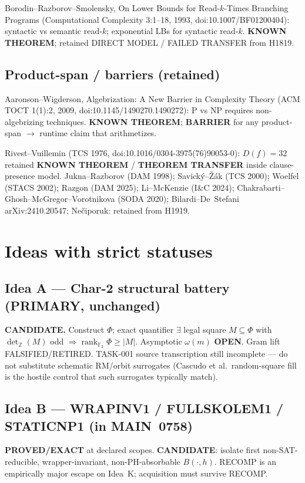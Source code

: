 \documentclass[11pt]{article}
\begin{document}
Borodin--Razborov--Smolensky, On Lower Bounds for Read-$k$-Times Branching Programs
(Computational Complexity 3:1--18, 1993, doi:10.1007/BF01200404):
syntactic vs semantic read-$k$; exponential LBs for syntactic read-$k$.
\textbf{KNOWN THEOREM}; retained DIRECT MODEL / FAILED TRANSFER from H1819.

\subsection*{Product-span / barriers (retained)}
Aaronson--Wigderson, Algebrization: A New Barrier in Complexity Theory
(ACM TOCT 1(1):2, 2009, doi:10.1145/1490270.1490272): P vs NP requires non-algebrizing
techniques.
\textbf{KNOWN THEOREM}; \textbf{BARRIER} for any product-span $\to$ runtime claim that
arithmetizes.

Rivest--Vuillemin (TCS 1976, doi:10.1016/0304-3975(76)90053-0): $D(f)=32$ retained
\textbf{KNOWN THEOREM} / \textbf{THEOREM TRANSFER} inside clause-presence model.
Jukna--Razborov (DAM 1998); Savick\'y--\v{Z}\'ak (TCS 2000); Woelfel (STACS 2002);
Razgon (DAM 2025); Li--McKenzie (I\&C 2024); Chakrabarti--Ghosh--McGregor--Vorotnikova
(SODA 2020); Bilardi--De~Stefani arXiv:2410.20547; Ne\v{c}iporuk: retained from H1919.

\section*{Ideas with strict statuses}
\subsection*{Idea A --- Char-2 structural battery (PRIMARY, unchanged)}
\textbf{CANDIDATE.} Construct $\Phi$; exact quantifier
$\exists$ legal square $M\subseteq\Phi$ with $\det_{\mathbb Z}(M)$ odd
$\Rightarrow\operatorname{rank}_{\mathbb F_2}\Phi\ge|M|$. Asymptotic $\omega(m)$ \textbf{OPEN}.
Gram lift FALSIFIED/RETIRED. TASK-001 source transcription still incomplete --- do not
substitute schematic RM/orbit surrogates (Cascudo et al.\ random-square fill is the
hostile control that such surrogates typically match).

\subsection*{Idea B --- WRAPINV1 / FULLSKOLEM1 / STATICNP1 (in MAIN~0758)}
\textbf{PROVED/EXACT} at declared scopes.
\textbf{CANDIDATE}: isolate first non-SAT-reducible, wrapper-invariant, non-PH-absorbable $B(\cdot,h)$.
RECOMP is an empirically major escape on Idea~K; acquisition must survive RECOMP.
\end{document}
